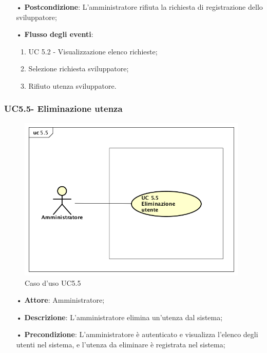 \begin{itemize}
\begin{itemize}
\begin{itemize}
\item[•] \textbf{Postcondizione}: L'amministratore rifiuta la richiesta di registrazione dello sviluppatore;

\item[•] \textbf{Flusso degli eventi}:

\begin{enumerate}

\item UC 5.2 - Visualizzazione elenco richieste;

\item Selezione richiesta sviluppatore;

\item Rifiuto utenza sviluppatore.

\end{enumerate}
\end{itemize}
\subsubsection{UC5.5- Eliminazione utenza}
\begin{figure}[H]
\centering
\includegraphics[width=11cm]{img/UC55.png} 
\caption{Caso d'uso UC5.5}
\end{figure}
\begin{itemize}
\item[•] \textbf{Attore}: Amministratore;

\item[•] \textbf{Descrizione}: L’amministratore elimina un’utenza dal sistema;

\item[•] \textbf{Precondizione}: L’amministratore \`{e} autenticato e visualizza l’elenco degli utenti nel sistema, e l’utenza da eliminare \`{e} registrata nel sistema;


\end{itemize}
\end{itemize}
\end{itemize}
